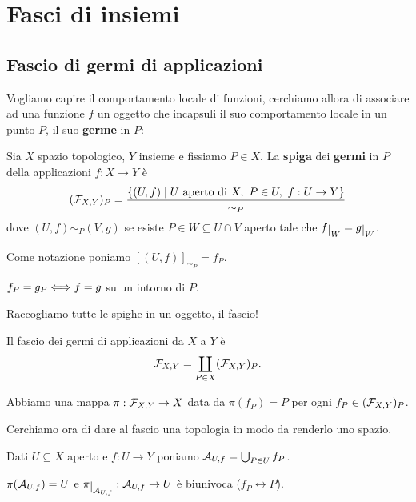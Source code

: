 \chapter{Fasci di insiemi}

\section{Fascio di germi di applicazioni}

Vogliamo capire il comportamento locale di funzioni, cerchiamo allora di associare ad una funzione $f$ un oggetto che incapsuli il suo comportamento locale in un punto $P$, il suo \textbf{germe} in $P$:

\begin{definition}[Germi]
Sia $X$ spazio topologico, $Y$ insieme e fissiamo $P\in X$. La \textbf{spiga} dei \textbf{germi} in $P$ della applicazioni $f:X\to Y$ \`e
\[(\mathcal{F}_{X,Y})_P=\frac{\left\{{(U,f)\mid U\text{ aperto di }X,\ P\in U,\ f:U\to Y}\right\}}{\sim_P}\]
dove $(U,f)\sim_P (V,g)$ se esiste $P\in W\subseteq U\cap V$ aperto tale che $f\res W=g\res W$.

Come notazione poniamo $[(U,f)]_{\sim_P}=f_P$.
\end{definition}
\begin{remark}
$f_P=g_P\Longleftrightarrow f=g$ su un intorno di $P$.
\end{remark}

Raccogliamo tutte le spighe in un oggetto, il fascio!

\begin{definition}
Il fascio dei germi di applicazioni da $X$ a $Y$ \`e
\[\mathcal{F}_{X,Y}=\coprod_{P\in X}(\mathcal{F}_{X,Y})_P.\]
\end{definition}

\begin{remark}
Abbiamo una mappa $\pi:\mathcal{F}_{X,Y}\to X$ data da $\pi(f_P)=P$ per ogni $f_P\in (\mathcal{F}_{X,Y})_P$.
\end{remark}

Cerchiamo ora di dare al fascio una topologia in modo da renderlo uno spazio.


\begin{notation}
Dati $U\subseteq X$ aperto e $f:U\to Y$ poniamo $\mathcal{A}_{U,f}=\bigcup_{P\in U}f_P$.
\end{notation}

\begin{remark}
$\pi(\mathcal{A}_{U,f})=U$ e $\pi\res{\Ac_{U,f}}:\Ac_{U,f}\to U$ \`e biunivoca ($f_P\leftrightarrow P$).
\end{remark}


